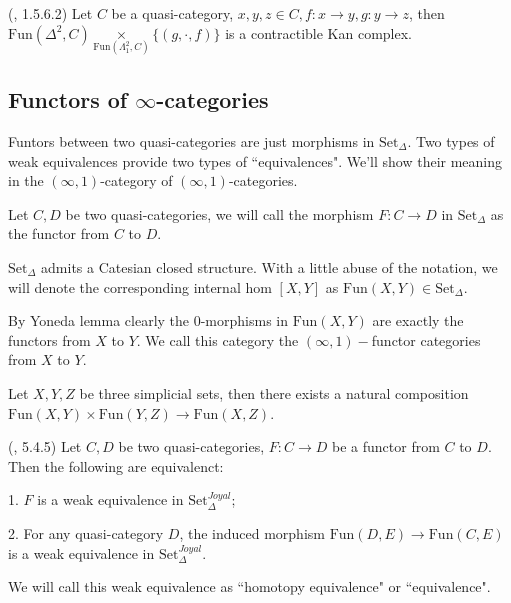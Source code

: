 \begin{theorem}(\textcite{ker}, 1.5.6.2)\label{composition_contractible_kan}
    Let $C$ be a quasi-category, $x,y,z\in C,f:x\to y,g: y\to z$, then $\text{Fun}(\Delta^2,C)\underset{\text{Fun}(\Lambda_1^2,C)}{\times}\{(g,\cdot,f)\}$ is a contractible Kan complex.
    
\end{theorem}

\subsection{Functors of $\infty$-categories}

Funtors between two quasi-categories are just morphisms in $\text{Set}_\Delta$. Two types of weak equivalences provide two types of ``equivalences". We'll show their meaning in the $(\infty,1)$-category of $(\infty,1)$-categories.



\begin{definition}
    Let $C,D$ be two quasi-categories, we will call the morphism $F:C\to D$ in $\text{Set}_\Delta$ as the functor from $C$ to $D$.
\end{definition}

\begin{proposition}
    $\text{Set}_\Delta$ admits a Catesian closed structure. With a little abuse of the notation, we will denote the corresponding internal hom $[X,Y]$ as $\text{Fun}(X,Y)\in \text{Set}_\Delta$. 
\end{proposition}

By Yoneda lemma clearly the 0-morphisms in $\text{Fun}(X,Y)$ are exactly the functors from $X$ to $Y$. We call this category the $(\infty,1)-$functor categories from $X$ to $Y$.

\begin{corollary}\label{nat_composition}
    Let $X,Y,Z$ be three simplicial sets, then there exists a natural composition $\text{Fun}(X,Y)\times \text{Fun}(Y,Z)\to \text{Fun}(X,Z)$.
\end{corollary}

\begin{theorem}(\textcite{lc}, 5.4.5)
    Let $C,D$ be two quasi-categories, $F:C\to D$ be a functor from $C$ to $D$. Then the following are equivalenct:

    1. $F$ is a weak equivalence in $\text{Set}_\Delta^{Joyal}$;

    2. For any quasi-category $D$, the induced morphism $\text{Fun}(D,E)\to \text{Fun}(C,E)$ is a weak equivalence in $\text{Set}_\Delta^{Joyal}$.

    We will call this weak equivalence as ``homotopy equivalence" or ``equivalence".
\end{theorem}

